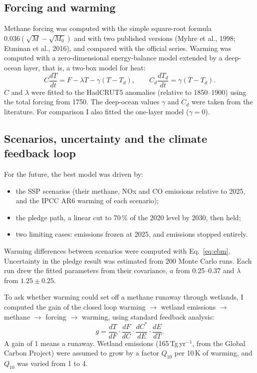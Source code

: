 \documentclass[11pt,a4paper]{article}
\begin{document}
\subsection{Forcing and warming}
Methane forcing was computed with the simple square-root formula $0.036(\sqrt{M}-\sqrt{M_0})$ and with two published versions (Myhre et al., 1998; Etminan et al., 2016), and compared with the official series. Warming was computed with a zero-dimensional energy-balance model extended by a deep-ocean layer, that is, a two-box model for heat:
\begin{equation}
C\frac{dT}{dt}=F-\lambda T-\gamma(T-T_d),\qquad C_d\frac{dT_d}{dt}=\gamma(T-T_d).
\label{eq:ebm}
\end{equation}
$C$ and $\lambda$ were fitted to the HadCRUT5 anomalies (relative to 1850--1900) using the total forcing from 1750. The deep-ocean values $\gamma$ and $C_d$ were taken from the literature. For comparison I also fitted the one-layer model ($\gamma=0$).

\subsection{Scenarios, uncertainty and the climate feedback loop}
For the future, the best model was driven by:
\begin{itemize}\itemsep0pt
\item the SSP scenarios (their methane, NOx and CO emissions relative to 2025, and the IPCC AR6 warming of each scenario);
\item the pledge path, a linear cut to 70\,\% of the 2020 level by 2030, then held;
\item two limiting cases: emissions frozen at 2025, and emissions stopped entirely.
\end{itemize}
Warming differences between scenarios were computed with Eq.~\eqref{eq:ebm}. Uncertainty in the pledge result was estimated from 200 Monte Carlo runs. Each run drew the fitted parameters from their covariance, $a$ from 0.25--0.37 and $\lambda$ from $1.25\pm0.25$.

To ask whether warming could set off a methane runaway through wetlands, I computed the gain of the closed loop warming $\to$ wetland emissions $\to$ methane $\to$ forcing $\to$ warming, using standard feedback analysis:
\begin{equation}
g=\frac{dT}{dF}\cdot\frac{dF}{dC}\cdot\frac{dC^*}{dE}\cdot\frac{dE}{dT}.
\label{eq:gain}
\end{equation}
A gain of 1 means a runaway. Wetland emissions (165\,Tg\,yr$^{-1}$, from the Global Carbon Project) were assumed to grow by a factor $Q_{10}$ per 10\,K of warming, and $Q_{10}$ was varied from 1 to 4.
\end{document}
